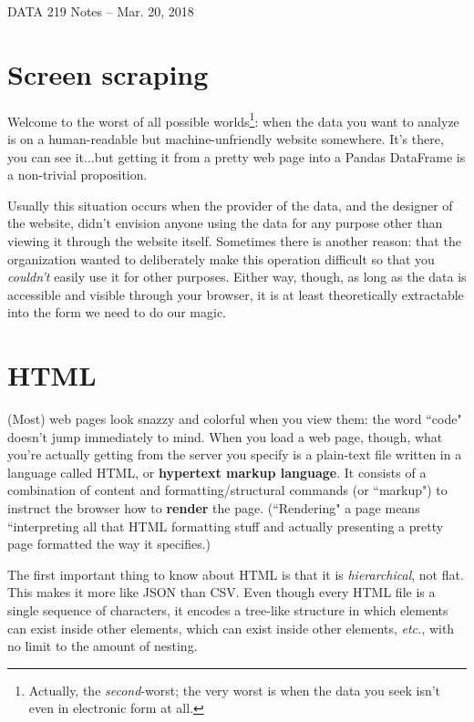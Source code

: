 \documentclass[12pt]{article}
\begin{document}
\begin{center}
\begin{Large}
DATA 219 Notes -- Mar. 20, 2018
\end{Large}
\end{center}

\section{Screen scraping}

Welcome to the worst of all possible worlds\footnote{Actually, the
\textit{second}-worst; the very worst is when the data you seek isn't even in
electronic form at all.}: when the data you want to analyze is on a
human-readable but machine-unfriendly website somewhere. It's there, you can
see it...but getting it from a pretty web page into a Pandas DataFrame is a
non-trivial proposition.

Usually this situation occurs when the provider of the data, and the designer
of the website, didn't envision anyone using the data for any purpose other
than viewing it through the website itself. Sometimes there is another reason:
that the organization wanted to deliberately make this operation difficult so
that you \textit{couldn't} easily use it for other purposes. Either way,
though, as long as the data is accessible and visible through your browser, it
is at least theoretically extractable into the form we need to do our magic.

\section{HTML}

(Most) web pages look snazzy and colorful when you view them: the word ``code"
doesn't jump immediately to mind. When you load a web page, though, what
you're actually getting from the server you specify is a plain-text file
written in a language called HTML, or \textbf{hypertext markup language}. It
consists of a combination of content and formatting/structural commands (or
``markup") to instruct the browser how to \textbf{render} the page.
(``Rendering" a page means ``interpreting all that HTML formatting stuff and
actually presenting a pretty page formatted the way it specifies.)

The first important thing to know about HTML is that it is
\textit{hierarchical}, not flat. This makes it more like JSON than CSV. Even
though every HTML file is a single sequence of characters, it encodes a
tree-like structure in which elements can exist inside other elements, which
can exist inside other elements, \textit{etc.}, with no limit to the amount of
nesting.
\end{document}
